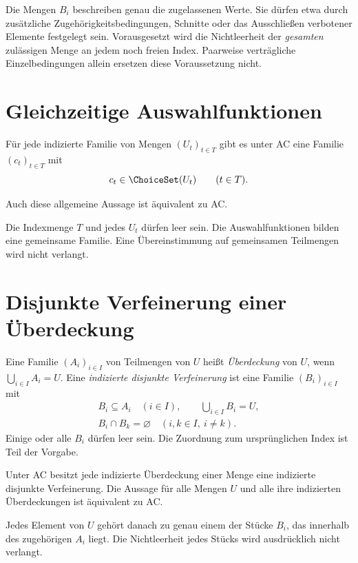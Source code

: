 Die Mengen $B_i$ beschreiben genau die zugelassenen Werte.
Sie dürfen etwa durch zusätzliche Zugehörigkeitsbedingungen,
Schnitte oder das Ausschließen verbotener Elemente festgelegt sein.
Vorausgesetzt wird die Nichtleerheit der \emph{gesamten} zulässigen
Menge an jedem noch freien Index. Paarweise verträgliche
Einzelbedingungen allein ersetzen diese Voraussetzung nicht.

\section{Gleichzeitige Auswahlfunktionen}

\begin{theorem}
\label{b09guide:thm:simultaneous}
Für jede indizierte Familie von Mengen $(U_t)_{t\in T}$ gibt es
unter AC eine Familie $(c_t)_{t\in T}$ mit
\[
 c_t\in\ChoiceSet(U_t)\qquad(t\in T).
\]

Auch diese allgemeine Aussage ist äquivalent zu AC.
\end{theorem}

Die Indexmenge $T$ und jedes $U_t$ dürfen leer sein.
Die Auswahlfunktionen bilden eine gemeinsame Familie.
Eine Übereinstimmung auf gemeinsamen Teilmengen wird nicht verlangt.

\clearpage
\section{Disjunkte Verfeinerung einer Überdeckung}

\begin{definition}
Eine Familie $(A_i)_{i\in I}$ von Teilmengen von $U$ heißt
\emph{Überdeckung} von $U$, wenn $\bigcup_{i\in I}A_i=U$.
Eine \emph{indizierte disjunkte Verfeinerung} ist eine Familie
$(B_i)_{i\in I}$ mit
\[
 \begin{gathered}
 B_i\subseteq A_i\quad(i\in I),\qquad
 \bigcup_{i\in I}B_i=U,\\
 B_i\cap B_k=\varnothing\quad(i,k\in I,\ i\ne k).
 \end{gathered}
\]
Einige oder alle $B_i$ dürfen leer sein.
Die Zuordnung zum ursprünglichen Index ist Teil der Vorgabe.
\end{definition}

\begin{theorem}
\label{b09guide:thm:refinement}
Unter AC besitzt jede indizierte Überdeckung einer Menge
eine indizierte disjunkte Verfeinerung.
Die Aussage für alle Mengen $U$ und alle ihre indizierten
Überdeckungen ist äquivalent zu AC.
\end{theorem}

Jedes Element von $U$ gehört danach zu genau einem der Stücke
$B_i$, das innerhalb des zugehörigen $A_i$ liegt.
Die Nichtleerheit jedes Stücks wird ausdrücklich nicht verlangt.

